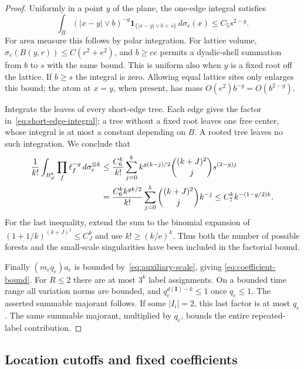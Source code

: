 \begin{proof}
Uniformly in a point $y$ of the plane, the one-edge integral satisfies
\begin{equation}
 \int_B (|x-y|\vee b)^{-g}
           \mathbf1_{\{|x-y|\vee b<s\}}\,d\sigma_e(x)
                  \leq C_5s^{2-g}.
 \label{eq:short-edge-integral}
\end{equation}
For area measure this follows by polar integration.  For lattice
volume, $\sigma_e(B(y,r))\leq C(r^2+e^2)$, and $b\geq ce$ permits a
dyadic-shell summation from $b$ to $s$ with the same bound.  This is
uniform also when $y$ is a fixed root off the lattice.  If $b\geq s$
the integral is zero.  Allowing equal lattice sites only enlarges this
bound; the atom at $x=y$, when present, has mass
$O(e^2)b^{-g}=O(b^{2-g})$.

Integrate the leaves of every short-edge tree.  Each edge gives the
factor in~\eqref{eq:short-edge-integral}; a tree without a fixed root
leaves one free center, whose integral is at most a constant depending
on $B$.  A rooted tree leaves no such integration.  We conclude that
\begin{align}
 \frac1{k!}\int_{B^k_{\ne}}\prod_f\ell_f^{-g}
                              \,d\sigma_e^{\otimes k}
 &\leq \frac{C_6^k}{k!}
       \sum_{j=0}^k k^{g(k-j)/2}
          \binom{(k+J)^2}{j}s^{(2-g)j} \notag\\
 &=\frac{C_6^k k^{gk/2}}{k!}
       \sum_{j=0}^k\binom{(k+J)^2}{j}k^{-j}
 \leq C_7^k k^{-(1-g/2)k}.
 \label{eq:factorial-forest}
\end{align}
For the last inequality, extend the sum to the binomial expansion of
$(1+1/k)^{(k+J)^2}\leq C_J^k$ and use $k!\geq(k/\mathrm e)^k$.
Thus both the number of possible forests and the small-scale
singularities have been included in the factorial bound.

Finally $(m_eq_e)a_e$ is bounded by~\eqref{eq:auxiliary-scale}, giving
\eqref{eq:coefficient-bound}.  For $R\leq2$ there are at most $3^k$
label assignments.  On a bounded time range all variation norms are
bounded, and $q_e^{d(\mathbf I)-k}\leq1$ once $q_e\leq1$.
The asserted summable majorant follows.  If some $|I_i|=2$, this last
factor is at most $q_e$.  The same summable majorant, multiplied by
$q_e$, bounds the entire repeated-label contribution.
\end{proof}

\subsection{Location cutoffs and fixed coefficients}


